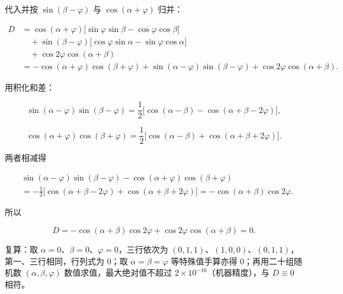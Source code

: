 \begin{answer}
代入并按 $\sin(\beta-\varphi)$ 与 $\cos(\alpha+\varphi)$ 归并：

\nopagebreak[4]
\[
\begin{aligned}
D&=\cos(\alpha+\varphi)\bigl[\sin\varphi\sin\beta-\cos\varphi\cos\beta\bigr]\\
&\quad+\sin(\beta-\varphi)\bigl[\cos\varphi\sin\alpha-\sin\varphi\cos\alpha\bigr]\\
&\quad+\cos 2\varphi\cos(\alpha+\beta)\\
&=-\cos(\alpha+\varphi)\cos(\beta+\varphi)+\sin(\alpha-\varphi)\sin(\beta-\varphi)+\cos 2\varphi\cos(\alpha+\beta).
\end{aligned}
\]

用积化和差：

\nopagebreak[4]
\[
\sin(\alpha-\varphi)\sin(\beta-\varphi)
=\frac12\bigl[\cos(\alpha-\beta)-\cos(\alpha+\beta-2\varphi)\bigr],
\]

\nopagebreak[4]
\[
\cos(\alpha+\varphi)\cos(\beta+\varphi)
=\frac12\bigl[\cos(\alpha-\beta)+\cos(\alpha+\beta+2\varphi)\bigr].
\]

两者相减得

\nopagebreak[4]
\[
\begin{aligned}
&\sin(\alpha-\varphi)\sin(\beta-\varphi)-\cos(\alpha+\varphi)\cos(\beta+\varphi)\\
&=-\frac12\bigl[\cos(\alpha+\beta-2\varphi)+\cos(\alpha+\beta+2\varphi)\bigr]
=-\cos(\alpha+\beta)\cos 2\varphi.
\end{aligned}
\]

所以

\nopagebreak[4]
\[
D=-\cos(\alpha+\beta)\cos 2\varphi+\cos 2\varphi\cos(\alpha+\beta)=0.
\]

复算：取 $\alpha=0$、$\beta=0$、$\varphi=0$，三行依次为 $(0,1,1)$、$(1,0,0)$、$(0,1,1)$，第一、三行相同，行列式为 $0$；取 $\alpha=\beta=\varphi$ 等特殊值手算亦得 $0$；再用二十组随机数 $(\alpha,\beta,\varphi)$ 数值求值，最大绝对值不超过 $2\times10^{-16}$（机器精度），与 $D\equiv0$ 相符。


\end{answer}
